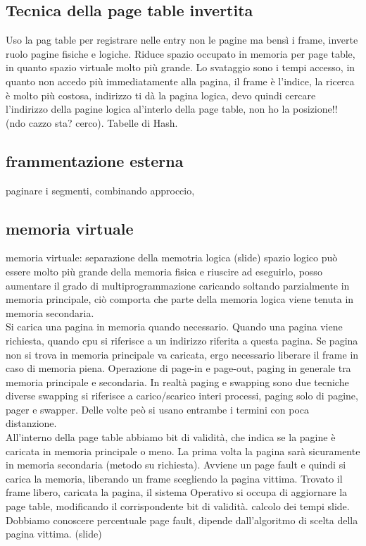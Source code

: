 \documentclass{article}
\begin{document}
 \subsection{Tecnica della page table invertita}
 Uso la pag table per registrare nelle entry non le pagine ma bensì i frame, inverte ruolo pagine fisiche e logiche. 
 Riduce spazio occupato in memoria per page table, in quanto spazio virtuale molto più grande. Lo svataggio sono i tempi 
 accesso, in quanto non accedo più immediatamente alla pagina, il frame è l'indice, la ricerca è molto più costosa, indirizzo ti 
 dà la pagina logica, devo quindi cercare l'indirizzo della pagine logica al'interlo della page table, non ho la posizione!!
 (ndo cazzo sta? cerco). Tabelle di Hash.
 \subsection{frammentazione esterna}
 paginare i segmenti, combinando approccio,
\subsection{memoria virtuale}
memoria virtuale: separazione della memotria logica (slide)
spazio logico può essere molto più grande della memoria fisica e riuscire ad eseguirlo, posso aumentare il grado di multiprogrammazione 
caricando soltando parzialmente in memoria principale, ciò comporta che parte della memoria logica viene tenuta in memoria secondaria. \\
Si carica una pagina in memoria quando necessario. Quando una pagina viene richiesta, quando cpu si riferisce a un indirizzo riferita 
a questa pagina. Se pagina non si trova in memoria principale va caricata, ergo necessario liberare il frame in caso di memoria piena.
Operazione di page-in e page-out, paging in generale tra memoria principale e secondaria. In realtà paging e swapping sono due tecniche diverse 
swapping si riferisce a carico/scarico interi processi, paging solo di pagine, pager e swapper. Delle volte peò si usano entrambe i termini 
con poca distanzione.\\
All'interno della page table abbiamo bit di validità, che indica se la pagine è caricata in memoria principale o meno. La prima volta la pagina 
sarà sicuramente in memoria secondaria (metodo su richiesta). Avviene un page fault e quindi si carica la memoria, liberando 
un frame scegliendo la pagina vittima. Trovato il frame libero, caricata la pagina, il sistema Operativo si occupa 
di aggiornare la page table, modificando il corrispondente bit di validità. calcolo dei tempi slide.\\
Dobbiamo conoscere percentuale page fault, dipende dall'algoritmo di scelta della pagina vittima. (slide)
\end{document}
